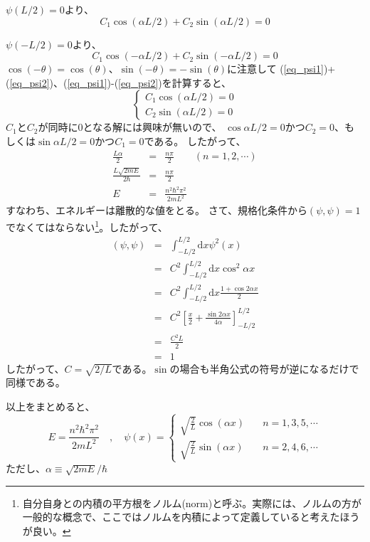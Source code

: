 \documentclass{jarticle}
\newcommand{\diff}{\mathrm d}
\begin{document}
$\psi(L/2) = 0$より、
\begin{equation}
  C_1 \cos{(\alpha L/2)} + C_2 \sin{(\alpha L/2)} = 0  \label{eq_psi1}
\end{equation}

$\psi(-L/2) = 0$より、
\begin{equation}
  C_1 \cos{(-\alpha L/2)} + C_2 \sin{(-\alpha L/2)} = 0 \label{eq_psi2}
\end{equation}
$\cos(-\theta) = \cos(\theta)$、$\sin(-\theta) = -\sin(\theta)$に注意して
(\ref{eq_psi1})+(\ref{eq_psi2})、(\ref{eq_psi1})-(\ref{eq_psi2})を計算すると、
\begin{equation}
  \left\{
  \begin{array}{c}
    C_1 \cos{(\alpha L/2)} = 0 \\
    C_2 \sin{(\alpha L/2)} = 0
  \end{array}
  \right.
\end{equation}
$C_1$と$C_2$が同時に$0$となる解には興味が無いので、
$\cos{\alpha L/2} = 0 $かつ$C_2=0$、もしくは$\sin{\alpha L/2} = 0 $かつ$C_1=0$である。
したがって、
\begin{eqnarray}
  \frac{L \alpha }{2} &=& \frac{n\pi}{2} \qquad (n = 1,2,\cdots)\\
  \frac{L \sqrt{2mE}}{2\hbar} &=& \frac{n\pi}{2} \\
  E &=& \frac{n^2 \hbar^2 \pi^2}{2mL^2}
\end{eqnarray}
すなわち、エネルギーは離散的な値をとる。
さて、規格化条件から$(\psi,\psi) = 1$でなくてはならない\footnote{%
  自分自身との内積の平方根をノルム(norm)と呼ぶ。実際には、ノルムの方が
  一般的な概念で、ここではノルムを内積によって定義していると考えたほうが良い。
}。したがって、
\begin{eqnarray*}
  (\psi,\psi) &=& \int_{-L/2}^{L/2} \!\! \diff x \psi^2(x) \\
  &=&  C^2 \int_{-L/2}^{L/2} \!\! \diff x \cos^2{\alpha x} \\
  &=& C^2 \int_{-L/2}^{L/2} \!\! \diff x \frac{1+\cos 2\alpha x}{2} \\
  &=& C^2 \left[ \frac{x}{2} +  \frac{\sin 2 \alpha x}{4 \alpha} \right]_{-L/2}^{L/2} \\
  &=& \frac{C^2 L}{2} \\
  &=& 1
\end{eqnarray*}
したがって、$C = \sqrt{2/L}$である。$\sin$の場合も半角公式の符号が逆になるだけで同様である。

以上をまとめると、
\begin{equation}
  E = \frac{n^2 \hbar^2 \pi^2}{2mL^2} \quad , \quad
  \psi(x) =
  \left\{
  \begin{array}{cc}
    \sqrt{\frac{2}{L}} \cos (\alpha x) & \quad n = 1,3,5,\cdots \\
    \sqrt{\frac{2}{L}} \sin (\alpha x) & \quad n = 2,4,6,\cdots
  \end{array}
  \right.
\end{equation}
ただし、$\alpha \equiv \sqrt{2mE}/\hbar$
\end{document}
